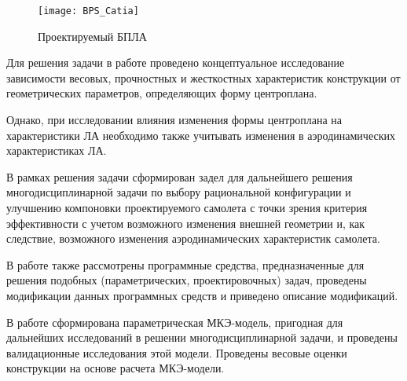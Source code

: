 \begin{figure}[ht]
\centering
\texttt{[image: BPS\_Catia]}
\caption{Проектируемый БПЛА}
\label{fig:BPS}
\end{figure}






Для решения задачи в работе проведено концептуальное исследование зависимости весовых, прочностных и жесткостных характеристик конструкции от геометрических параметров, определяющих форму центроплана.

Однако, при исследовании влияния изменения формы центроплана на характеристики ЛА необходимо также учитывать изменения в аэродинамических характеристиках ЛА. 

В рамках решения задачи сформирован задел для дальнейшего решения многодисциплинарной задачи по выбору рациональной конфигурации и улучшению компоновки проектируемого самолета с точки зрения критерия эффективности с учетом возможного изменения внешней геометрии и, как следствие, возможного изменения аэродинамических характеристик самолета. 

В работе также рассмотрены программные средства, предназначенные для решения подобных (параметрических, проектировочных) задач, проведены модификации данных программных средств и приведено описание модификаций.  

В работе сформирована параметрическая МКЭ-модель, пригодная для дальнейших исследований в решении многодисциплинарной задачи, и проведены валидационные исследования этой модели. Проведены весовые оценки конструкции на основе расчета МКЭ-модели.   

 